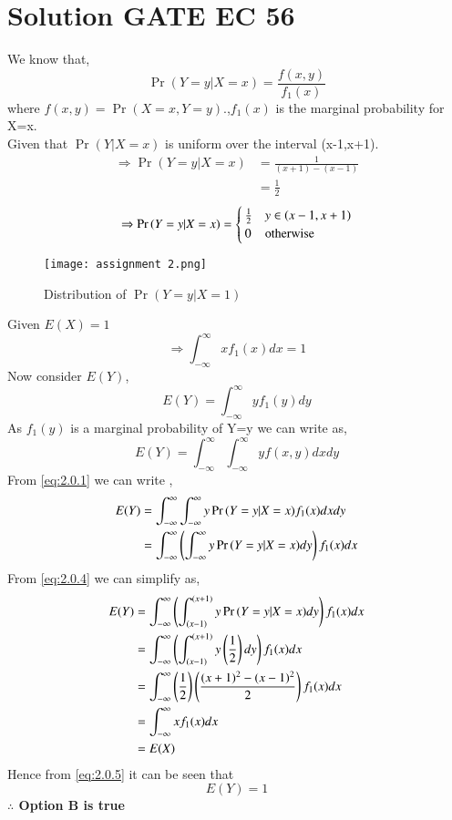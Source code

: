 \documentclass[journal,12pt,twocolumn]{IEEEtran}
\begin{document}
\section{Solution GATE EC 56}
We know that,
\begin{equation}
    \Pr{(Y=y|X=x)}=\frac{f(x,y)}{f_1(x)} \label{eq:2.0.1}
\end{equation}
where $f(x,y)=\Pr(X=x,Y=y)$.,$f_1(x)$ is the marginal probability for X=x.\\
Given that $\Pr{(Y|X=x)}$ is uniform over the interval (x-1,x+1).
\begin{align}
    \Rightarrow \Pr{(Y=y|X=x)} &= \frac{1}{(x+1)-(x-1)}\\
    &=\frac{1}{2}
\end{align}
\begin{equation}
    \Rightarrow \Pr{(Y=y|X=x)}=
    \begin{cases}
    \frac{1}{2} & y \in \left(x-1,x+1\right)\\
    0 & \text{otherwise}
    \end{cases}\label{eq:2.0.4}
\end{equation}
\begin{figure}[H]
    \centering
    \texttt{[image: assignment 2.png]}
    \caption{Distribution of $\Pr{(Y=y|X=1)}$}
\end{figure}
Given $E(X)=1$
\begin{equation}
    \Rightarrow \int_{-\infty}^{\infty}x f_{1}(x)dx=1 \label{eq:2.0.5}
\end{equation}
Now consider $E(Y)$,
\begin{equation}
    E(Y)=\int_{-\infty}^{\infty}yf_{1}(y)dy
\end{equation}
As $f_{1}(y)$ is a marginal probability of Y=y we can write as,
\begin{equation}
    E(Y)=\int_{-\infty}^{\infty}\int_{-\infty}^{\infty}y f(x,y)dx dy
\end{equation}
From \ref{eq:2.0.1} we can write ,
\begin{align}
    E(Y)&=\int_{-\infty}^{\infty}\int_{-\infty}^{\infty}y \Pr{(Y=y|X=x)} f_{1}(x) dx dy\\
    &=\int_{-\infty}^{\infty}\left(\int_{-\infty}^{\infty}y \Pr{(Y=y|X=x)}dy\right) f_{1}(x) dx
\end{align}
From \ref{eq:2.0.4} we can simplify as,
\begin{align}
    E(Y)&=\int_{-\infty}^{\infty}\left(\int_{(x-1)}^{(x+1)}y \Pr{(Y=y|X=x)}dy\right) f_{1}(x) dx\\
    &=\int_{-\infty}^{\infty}\left(\int_{(x-1)}^{(x+1)}y \left(\frac{1}{2}\right) dy\right) f_{1}(x) dx\\
    &=\int_{-\infty}^{\infty} \left(\frac{1}{2}\right) \left(\frac{(x+1)^2-(x-1)^2}{2}\right)  f_{1}(x) dx\\
    &= \int_{-\infty}^{\infty}x f_{1}(x)dx\\
    &=E(X)
\end{align}
Hence from \ref{eq:2.0.5} it can be seen that 
\begin{equation}
    E(Y)=1
\end{equation}
\textbf{$\therefore$ Option B is true}

\end{document}
